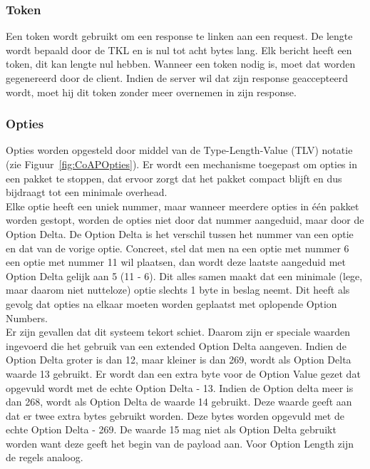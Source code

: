 \subsubsection{Token}

Een token wordt gebruikt om een response te linken aan een request. De lengte wordt bepaald door de TKL en is nul tot acht bytes lang. Elk bericht heeft een token, dit kan lengte nul hebben. Wanneer een token nodig is, moet dat worden gegenereerd door de client. Indien de server wil dat zijn response geaccepteerd wordt, moet hij dit token zonder meer overnemen in zijn response.

\subsubsection{Opties}

Opties worden opgesteld door middel van de Type-Length-Value (TLV) notatie (zie Figuur~\ref{fig:CoAPOpties}). Er wordt een mechanisme toegepast om opties in een pakket te stoppen, dat ervoor zorgt dat het pakket compact blijft en dus bijdraagt tot een minimale overhead.\\

Elke optie heeft een uniek nummer, maar wanneer meerdere opties in \'{e}\'{e}n pakket worden gestopt, worden de opties niet door dat nummer aangeduid, maar door de Option Delta. De Option Delta is het verschil tussen het nummer van een optie en dat van de vorige optie.
Concreet, stel dat men na een optie met nummer 6 een optie met nummer 11 wil plaatsen, dan wordt deze laatste aangeduid met Option Delta gelijk aan 5 (11 - 6). Dit alles samen maakt dat een minimale (lege, maar daarom niet nutteloze) optie slechts 1 byte in beslag neemt. Dit heeft als gevolg dat opties na elkaar moeten worden geplaatst met oplopende Option Numbers.\\

Er zijn gevallen dat dit systeem tekort schiet. Daarom zijn er speciale waarden ingevoerd die het gebruik van een extended Option Delta aangeven. Indien de Option Delta groter is dan 12, maar kleiner is dan 269, wordt als Option Delta waarde 13 gebruikt. Er wordt dan een extra byte voor de Option Value gezet dat opgevuld wordt met de echte Option Delta - 13. Indien de Option delta meer is dan 268, wordt als Option Delta de waarde 14 gebruikt. Deze waarde geeft aan dat er twee extra bytes gebruikt worden. Deze bytes worden opgevuld met de echte Option Delta - 269. De waarde 15 mag niet als Option Delta gebruikt worden want deze geeft het begin van de payload aan. Voor Option Length zijn de regels analoog.


